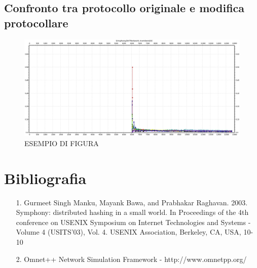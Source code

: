 \documentclass[	
	DIV=calc,
	paper=a4,
	fontsize=11pt,
	onecolumn
]{scrartcl} %
\begin{document}
	
	
	
	\subsection{Confronto tra protocollo originale e modifica protocollare}
	
	
	\begin{figure}[H]
		\centering
		\includegraphics[scale=0.35]	{SymphonyDHT/plots/PercentageOfMessagesSent/128_Nodes_SlowAccess/SymphonyDHT_128Nodes_SlowAccess_Node0.png}
		\caption{ESEMPIO DI FIGURA}
		\label{Figura }
	\end{figure}
	
	
	
\section{Bibliografia}
\begin{itemize}
\item[1.] Gurmeet Singh Manku, Mayank Bawa, and Prabhakar Raghavan. 2003. Symphony: distributed
hashing in a small world. In Proceedings of the 4th conference on USENIX Symposium on
Internet Technologies and Systems - Volume 4 (USITS'03), Vol. 4. USENIX Association,
Berkeley, CA, USA, 10-10
\item[2.] Omnet++ Network Simulation Framework - http://www.omnetpp.org/ 
\end{itemize}
\end{document}
